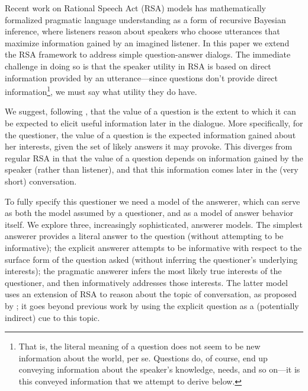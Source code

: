 \documentclass[12pt, floatsintext, jou]{apa6}
\begin{document}
Recent work on Rational Speech Act (RSA) models \cite{FrankGoodman12_PragmaticReasoningLanguageGames, GoodmanStuhlmuller13_KnowledgeImplicature} has mathematically formalized pragmatic language understanding as a form of recursive Bayesian inference, where listeners reason about speakers who choose utterances that maximize information gained by an imagined listener.
In this paper we extend the RSA framework to address simple question-answer dialogs.
The immediate challenge in doing so is that the speaker utility in RSA is based on direct information provided by an utterance---since questions don't provide direct information\footnote{That is, the literal meaning of a question does not seem to be new information about the world, per se. Questions do, of course, end up conveying information about the speaker's knowledge, needs, and so on---it is this conveyed information that we attempt to derive below.}, we must say what utility they do have. 

We suggest, following , that the value of a question is the extent to which it can be expected to elicit useful information later in the dialogue. 
More specifically, for the questioner, the value of a question is the expected information gained about her interests, given the set of likely answers it may provoke. 
This diverges from regular RSA in that the value of a question depends on information gained by the speaker (rather than listener), and that this information comes later in the (very short) conversation.

To fully specify this questioner we need a model of the answerer, which can serve as both the model assumed by a questioner, and as a model of answer behavior itself. We explore three, increasingly sophisticated, answerer models. The simplest answerer provides a literal answer to the question (without attempting to be informative);   
the explicit answerer attempts to be informative with respect to the surface form of the question asked (without inferring the questioner's underlying interests);  
the pragmatic answerer infers the most likely true interests of the questioner, and then informatively addresses those interests.
The latter model uses an extension of RSA to reason about the topic of conversation, as proposed by ; it goes beyond previous work by using the explicit question as a (potentially indirect) cue to this topic. 
\end{document}
